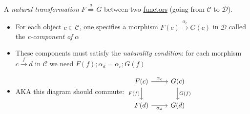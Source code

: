 A \emph{natural transformation} $F \overset{a}\Rightarrow G$ between two \hyperref[D3.35]{functors} (going from $\mathcal{C}$ to $\mathcal{D}$).

\begin{itemize}
    \item For each object $c \in \mathcal{C}$, one specifies a morphism $F(c)\xrightarrow{\alpha_c}G(c)$ in $\mathcal{D}$ called the \emph{c-component of} $\alpha$
    \item These components must satisfy the \emph{naturality condition}: for each morphism $c \xrightarrow{f} d$ in $\mathcal{C}$ we need $F(f);\alpha_d=\alpha_c;G(f)$
    \item AKA this diagram should commute: $\begin{tikzcd}F(c) \arrow[r, "\alpha_c"] \arrow[d, "F(f)"'] & G(c)\arrow[d, "G(f)"] \\F(d) \arrow[r, "\alpha_d"']& G(d)\end{tikzcd}$
  \end{itemize}
